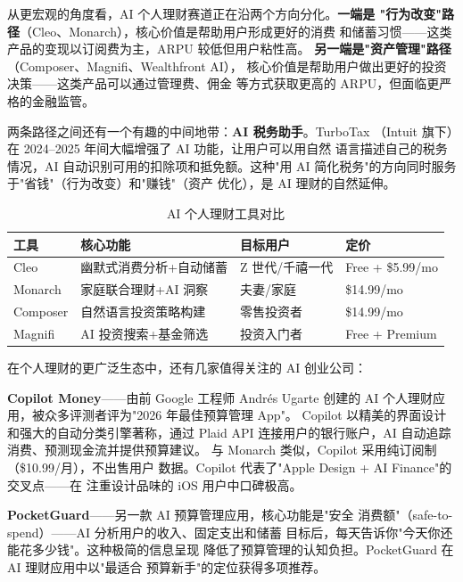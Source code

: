 从更宏观的角度看，AI 个人理财赛道正在沿两个方向分化。\textbf{一端是
"行为改变"路径}（Cleo、Monarch），核心价值是帮助用户形成更好的消费
和储蓄习惯——这类产品的变现以订阅费为主，ARPU 较低但用户粘性高。
\textbf{另一端是"资产管理"路径}（Composer、Magnifi、Wealthfront AI），
核心价值是帮助用户做出更好的投资决策——这类产品可以通过管理费、佣金
等方式获取更高的 ARPU，但面临更严格的金融监管。

两条路径之间还有一个有趣的中间地带：\textbf{AI 税务助手}。TurboTax
（Intuit 旗下）在 2024--2025 年间大幅增强了 AI 功能，让用户可以用自然
语言描述自己的税务情况，AI 自动识别可用的扣除项和抵免额。这种"用
AI 简化税务"的方向同时服务于"省钱"（行为改变）和"赚钱"（资产
优化），是 AI 理财的自然延伸。

\begin{table}[htbp]
\centering
\caption{AI 个人理财工具对比}
\label{tab:finance-comparison}
\small
\begin{tabularx}{\textwidth}{l X l l}
\toprule
\rowcolor{figLightGray}
\textbf{工具} & \textbf{核心功能} & \textbf{目标用户} & \textbf{定价} \\
\midrule
Cleo       & 幽默式消费分析+自动储蓄     & Z 世代/千禧一代     & Free + \$5.99/mo \\
Monarch    & 家庭联合理财+AI 洞察        & 夫妻/家庭           & \$14.99/mo \\
Composer   & 自然语言投资策略构建        & 零售投资者           & \$14.99/mo \\
Magnifi    & AI 投资搜索+基金筛选        & 投资入门者           & Free + Premium \\
\bottomrule
\end{tabularx}
\end{table}

在个人理财的更广泛生态中，还有几家值得关注的 AI 创业公司：

\textbf{Copilot Money}——由前 Google 工程师 Andr\'{e}s Ugarte 创建的
AI 个人理财应用，被众多评测者评为"2026 年最佳预算管理 App"。
Copilot 以精美的界面设计和强大的自动分类引擎著称，通过 Plaid API
连接用户的银行账户，AI 自动追踪消费、预测现金流并提供预算建议。
与 Monarch 类似，Copilot 采用纯订阅制（\$10.99/月），不出售用户
数据。Copilot 代表了"Apple Design + AI Finance"的交叉点——在
注重设计品味的 iOS 用户中口碑极高。

\textbf{PocketGuard}——另一款 AI 预算管理应用，核心功能是"安全
消费额"（safe-to-spend）——AI 分析用户的收入、固定支出和储蓄
目标后，每天告诉你"今天你还能花多少钱"。这种极简的信息呈现
降低了预算管理的认知负担。PocketGuard 在 AI 理财应用中以"最适合
预算新手"的定位获得多项推荐。

